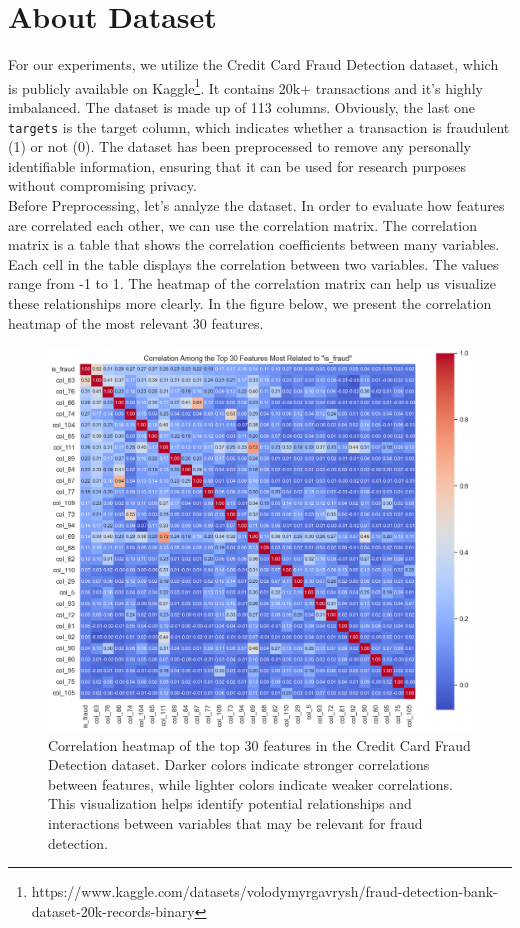 \documentclass[10pt]{article}
\begin{document}
\section{About Dataset}
For our experiments, we utilize the Credit Card Fraud Detection dataset, which is publicly available on Kaggle\footnote{https://www.kaggle.com/datasets/volodymyrgavrysh/fraud-detection-bank-dataset-20k-records-binary}. It contains 20k+ transactions and it's highly imbalanced. The dataset is made up of 113 columns. Obviously, the last one \texttt{targets} is the target column, which indicates whether a transaction is fraudulent (1) or not (0). The dataset has been preprocessed to remove any personally identifiable information, ensuring that it can be used for research purposes without compromising privacy.\\
Before Preprocessing, let's analyze the dataset. In order to evaluate how features are correlated each other, we can use the correlation matrix. The correlation matrix is a table that shows the correlation coefficients between many variables. Each cell in the table displays the correlation between two variables. The values range from -1 to 1. The heatmap of the correlation matrix can help us visualize these relationships more clearly. In the figure below, we present the correlation heatmap of the most relevant 30 features. 
\begin{figure}[H]
	\centering
	\includegraphics[height = 0.6\textheight]{img/correlation_heatmap_top_30_features.png}
	\caption{Correlation heatmap of the top 30 features in the Credit Card Fraud Detection dataset. Darker colors indicate stronger correlations between features, while lighter colors indicate weaker correlations. This visualization helps identify potential relationships and interactions between variables that may be relevant for fraud detection.}
\end{figure}
\end{document}

